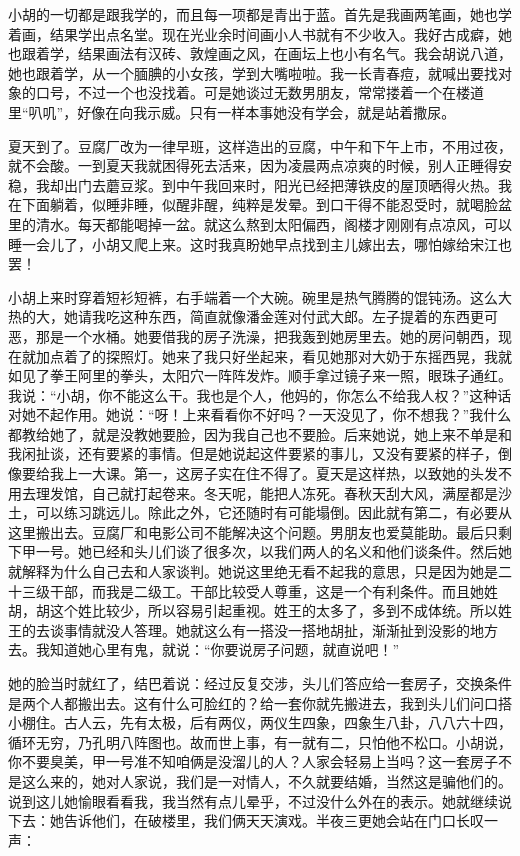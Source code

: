 小胡的一切都是跟我学的，而且每一项都是青出于蓝。首先是我画两笔画，她也学着画，结果学出点名堂。现在光业余时间画小人书就有不少收入。我好古成癖，她也跟着学，结果画法有汉砖、敦煌画之风，在画坛上也小有名气。我会胡说八道，她也跟着学，从一个腼腆的小女孩，学到大嘴啦啦。我一长青春痘，就喊出要找对象的口号，不过一个也没找着。可是她谈过无数男朋友，常常搂着一个在楼道里“叭叽”，好像在向我示威。只有一样本事她没有学会，就是站着撒尿。 

夏天到了。豆腐厂改为一律早班，这样造出的豆腐，中午和下午上市，不用过夜，就不会酸。一到夏天我就困得死去活来，因为凌晨两点凉爽的时候，别人正睡得安稳，我却出门去蘑豆浆。到中午我回来时，阳光已经把薄铁皮的屋顶晒得火热。我在下面躺着，似睡非睡，似醒非醒，纯粹是发晕。到口干得不能忍受时，就喝脸盆里的清水。每天都能喝掉一盆。就这么熬到太阳偏西，阁楼才刚刚有点凉风，可以睡一会儿了，小胡又爬上来。这时我真盼她早点找到主儿嫁出去，哪怕嫁给宋江也罢！ 

小胡上来时穿着短衫短裤，右手端着一个大碗。碗里是热气腾腾的馄钝汤。这么大热的大，她请我吃这种东西，简直就像潘金莲对付武大郎。左子提着的东西更可恶，那是一个水桶。她要借我的房子洗澡，把我轰到她房里去。她的房问朝西，现在就加点着了的探照灯。她来了我只好坐起来，看见她那对大奶于东摇西晃，我就如见了拳王阿里的拳头，太阳穴一阵阵发炸。顺手拿过镜子来一照，眼珠子通红。我说：“小胡，你不能这么干。我也是个人，他妈的，你怎么不给我人权？”这种话对她不起作用。她说：“呀！上来看看你不好吗？一天没见了，你不想我？”我什么都教给她了，就是没教她要脸，因为我自己也不要脸。后来她说，她上来不单是和我闲扯谈，还有要紧的事情。但是她说起这件要紧的事儿，又没有要紧的样子，倒像要给我上一大课。第一，这房子实在住不得了。夏天是这样热，以致她的头发不用去理发馆，自己就打起卷来。冬天呢，能把人冻死。春秋天刮大风，满屋都是沙土，可以练习跳远儿。除此之外，它还随时有可能塌倒。因此就有第二，有必要从这里搬出去。豆腐厂和电影公司不能解决这个问题。男朋友也爱莫能助。最后只剩下甲一号。她已经和头儿们谈了很多次，以我们两人的名义和他们谈条件。然后她就解释为什么自己去和人家谈判。她说这里绝无看不起我的意思，只是因为她是二十三级干部，而我是二级工。干部比较受人尊重，这是一个有利条件。而且她姓胡，胡这个姓比较少，所以容易引起重视。姓王的太多了，多到不成体统。所以姓王的去谈事情就没人答理。她就这么有一搭没一搭地胡扯，渐渐扯到没影的地方去。我知道她心里有鬼，就说：“你要说房子问题，就直说吧！” 

她的脸当时就红了，结巴着说：经过反复交涉，头儿们答应给一套房子，交换条件是两个人都搬出去。这有什么可脸红的？给一套你就先搬进去，我到头儿们问口搭小棚住。古人云，先有太极，后有两仪，两仪生四象，四象生八卦，八八六十四，循环无穷，乃孔明八阵图也。故而世上事，有一就有二，只怕他不松口。小胡说，你不要臭美，甲一号准不知咱俩是没溜儿的人？人家会轻易上当吗？这一套房子不是这么来的，她对人家说，我们是一对情人，不久就要结婚，当然这是骗他们的。说到这儿她愉眼看看我，我当然有点儿晕乎，不过没什么外在的表示。她就继续说下去：她告诉他们，在破楼里，我们俩天天演戏。半夜三更她会站在门口长叹一声： 

